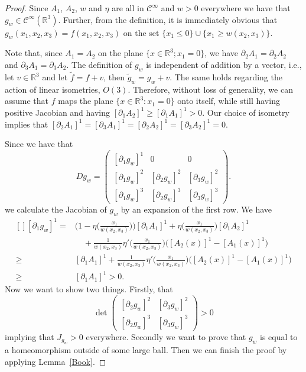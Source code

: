 \documentclass[12pt,a4paper]{amsart}
\theoremstyle{plain}
\theoremstyle{definition}
\numberwithin{equation}{section}
\def\er{\mathbb R}
\begin{document}
	\begin{proof}
		Since $A_1$, $A_2$, $w$ and $\eta$ are all in $\mathcal{C}^{\infty}$ and $w>0$ everywhere we have that $g_w\in \mathcal{C}^{\infty}(\er^3)$. Further, from the definition, it is immediately obvious that $g_w(x_1,x_2,x_3) = f(x_1,x_2,x_3)$ on the set $\{x_1\leq 0\}\cup \{x_1\geq w(x_2,x_3)\}$.
		
		
		Note that, since $A_1 = A_2$ on the plane $\{x\in \er^3; x_1=0\}$, we have $\partial_2A_1 = \partial_2A_2$ and $\partial_3A_1 = \partial_3A_2$. The definition of $g_w$ is independent of addition by a vector, i.e., let $v\in \er^3$ and let $\tilde{f} = f+v$, then $\tilde{g}_{w} =g_w + v$. The same holds regarding the action of linear isometries, $O(3)$. Therefore, without loss of generality, we can assume that $f$ maps the plane $\{x\in \er^3: x_1=0\}$ onto itself, while still having positive Jacobian and having $[\partial_1 A_2]^1 \geq [\partial_1 A_1]^1>0$. Our choice of isometry implies that $[\partial_2 A_1]^1 = [\partial_3 A_1]^1 = [\partial_2 A_2]^1 = [\partial_3 A_2]^1 = 0$.
		
		
		Since we have that
		\begin{equation}\label{TheMatrix}
			Dg_w = \left( \begin{matrix}
			[\partial_1g_w]^1 &0 &0\\
			[\partial_1g_w]^2 &[\partial_2g_w]^2 & [\partial_3g_w]^2\\
			[\partial_1g_w]^3 &[\partial_2g_w]^3 & [\partial_3g_w]^3
		\end{matrix}\right).
		\end{equation}
		we calculate the Jacobian of $g_w$ by an expansion of the first row. We have
		\begin{equation}\label{D1Posi}
			\begin{aligned}[]
				[\partial_1g_w]^1  =&  \Big(1-\eta\Big(\frac{x_1}{w(x_2,x_3)}\Big)\Big)[\partial_1 A_1]^1+ \eta\Big(\frac{x_1}{w(x_2,x_3)}\Big)[\partial_1 A_2]^1\\
				&  \quad +\frac{1}{w(x_2,x_3)}\eta'\Big(\frac{x_1}{w(x_2,x_3)}\Big)\big([A_2(x)]^1 - [A_1(x)]^1\big) \\
				\geq&  [\partial_1 A_1]^1 + \frac{1}{w(x_2,x_3)}\eta'\Big(\frac{x_1}{w(x_2,x_3)}\Big)\big([A_2(x)]^1 - [A_1(x)]^1\big) \\
				\geq&  [\partial_1 A_1]^1 >0.
			\end{aligned}
		\end{equation}
		Now we want to show two things. Firstly, that 
		$$
		\det \left( \begin{matrix}
			[\partial_2g_w]^2 & [\partial_3g_w]^2\\
			[\partial_2g_w]^3 & [\partial_3g_w]^3
		\end{matrix}\right)>0
		$$
		implying that $J_{g_w}>0$ everywhere. Secondly we want to prove that $g_w$ is equal to a homeomorphism outside of some large ball. Then we can finish the proof by applying Lemma~\ref{Book}. 
		

\end{proof}
\end{document}
